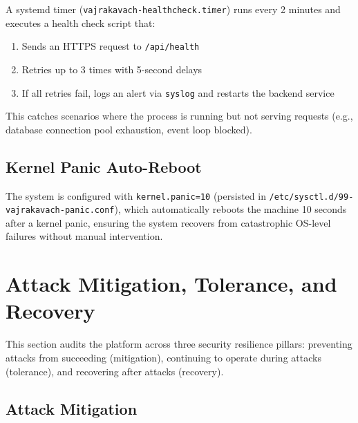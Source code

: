 \documentclass[12pt,a4paper]{article}
\begin{document}
A systemd timer (\texttt{vajrakavach-healthcheck.timer}) runs every 2 minutes and
executes a health check script that:

\begin{enumerate}
  \item Sends an HTTPS request to \texttt{/api/health}
  \item Retries up to 3 times with 5-second delays
  \item If all retries fail, logs an alert via \texttt{syslog} and restarts the backend service
\end{enumerate}

This catches scenarios where the process is running but not serving requests
(e.g., database connection pool exhaustion, event loop blocked).

\subsection{Kernel Panic Auto-Reboot}

The system is configured with \texttt{kernel.panic=10} (persisted in
\texttt{/etc/sysctl.d/99-vajrakavach-panic.conf}), which automatically reboots the
machine 10 seconds after a kernel panic, ensuring the system recovers from
catastrophic OS-level failures without manual intervention.

\section{Attack Mitigation, Tolerance, and Recovery}

This section audits the platform across three security resilience pillars:
preventing attacks from succeeding (mitigation), continuing to operate during
attacks (tolerance), and recovering after attacks (recovery).

\subsection{Attack Mitigation}
\end{document}
